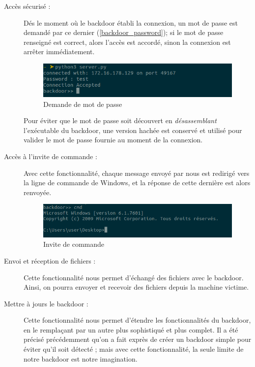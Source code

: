         \begin{description}
            \item[Accès sécurisé :] Dés le moment où le backdoor établi la connexion, un mot de passe est
                demandé par ce dernier (\autoref{backdoor_password}); si le mot de passe renseigné est correct, 
                alors l'accès est accordé, sinon la connexion est arrêter immédiatement. %

                \begin{figure}[h!]
                    \centering
                    \includegraphics[width=0.9\linewidth]{images/backdoor_password.png}
                    \caption{Demande de mot de passe}
                    \label{backdoor_password}
                \end{figure}

                Pour éviter que le mot de passe soit découvert en \emph{désassemblant} l'exécutable du backdoor,
                une version hachée est conservé et utilisé pour valider le mot de passe fournie au moment de la 
                connexion. %

            \item[Accès à l'invite de commande :] Avec cette fonctionnalité, 
                chaque message envoyé par nous est redirigé vers la ligne 
                de commande de Windows, et la réponse de cette dernière est alors renvoyée.
                \begin{figure}[h!]
                    \centering
                    \includegraphics[width=0.9\linewidth]{images/backdoor_cmd.png}
                    \caption{Invite de commande}
                    \label{backdoor_cmd}
                \end{figure}

            \item[Envoi et réception de fichiers :] Cette fonctionnalité nous permet d'échangé des fichiers 
                avec le backdoor. Ainsi, on pourra envoyer et recevoir des fichiers depuis la machine victime.

            \item[Mettre à jours le backdoor :] Cette fonctionnalité nous permet d'étendre les fonctionnalités du
                backdoor, en le remplaçant par un autre plus sophistiqué et plus complet. Il a été précisé 
                précédemment qu'on a fait exprès de créer un backdoor simple pour éviter qu'il soit détecté ; mais 
                avec cette fonctionnalité, la seule limite de notre backdoor est notre imagination.
        \end{description}


